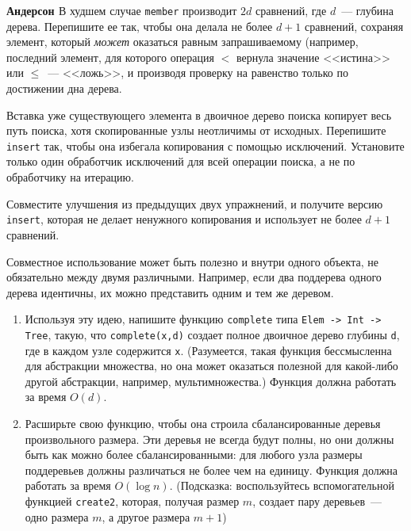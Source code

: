 \begin{frame}
\begin{exercise}\textbf{Андерсон \cite{Andersson1991}}\label{ex:2.2}
  В худшем случае \lstinline{member} производит $2d$ сравнений, где
  $d$~--- глубина дерева. Перепишите ее так, чтобы она делала не более
  $d+1$ сравнений, сохраняя элемент, который \emph{может} оказаться
  равным запрашиваемому (например, последний элемент, для которого
  операция $<$ вернула значение <<истина>> или $\le$~--- <<ложь>>, и
  производя проверку на равенство только по достижении дна дерева.
\end{exercise}

\begin{exercise}\label{ex:2.3}
  Вставка уже существующего элемента в двоичное дерево поиска копирует
  весь путь поиска, хотя скопированные узлы неотличимы от
  исходных. Перепишите \lstinline{insert} так, чтобы она избегала
  копирования с помощью исключений. Установите только один обработчик
  исключений для всей операции поиска, а не по обработчику на итерацию.
\end{exercise}

\begin{exercise}\label{ex:2.4}
  Совместите улучшения из предыдущих двух упражнений, и получите
  версию \lstinline{insert}, которая не делает ненужного копирования и
  использует не более $d+1$ сравнений.
\end{exercise}
\end{frame}

\begin{frame}
\begin{exercise}\label{ex:2.5}
  Совместное использование может быть полезно и внутри одного объекта, не
  обязательно между двумя различными.  Например, если два поддерева
  одного дерева идентичны, их можно представить одним и тем же
  деревом.
  \begin{enumerate}
    \item Используя эту идею, напишите функцию \lstinline{complete} типа
    \texttt{Elem -> Int -> Tree}, такую, что
    \texttt{complete(x,d)} создает полное двоичное дерево глубины
    \lstinline{d}, где в каждом узле содержится \lstinline{x}.
    (Разумеется, такая функция бессмысленна для абстракции множества,
    но она может оказаться полезной для какой-либо другой абстракции,
    например, мультимножества.) Функция должна работать за время $O(d)$.
    \item Расширьте свою функцию, чтобы она строила сбалансированные
    деревья произвольного размера. Эти деревья не всегда будут полны,
    но они должны быть как можно более сбалансированными: для любого
    узла размеры поддеревьев должны различаться не более чем на
    единицу. Функция должна работать за время $O(\log n)$. (Подсказка:
    воспользуйтесь вспомогательной функцией \lstinline{create2},
    которая, получая размер $m$, создает пару деревьев~--- одно размера
    $m$, а другое размера $m+1$)
  \end{enumerate}
\end{exercise}
\end{frame}


